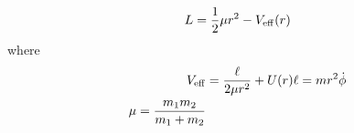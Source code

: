 

\vspace*{\fill}
\centering

\begin{align*}
    L = \frac{1}{2}\mu r^2 - V_{\rm eff}(r) 
\end{align*}
where
\begin{align*}
    V_{\rm eff} &= \frac{\ell}{2 \mu r^2} + U(r) 
    \ell = mr^2 \dot{\phi} \\
    \mu = \frac{m_1 m_2}{m_1 + m_2}
\end{align*}
\centering
\vspace*{\fill}

